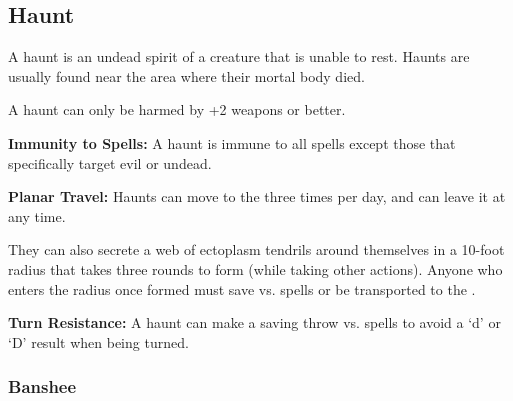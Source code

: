 \begin{multicols*}{2}
\subsection{Haunt}
A haunt is an undead spirit of a creature that is unable to rest. Haunts are usually found near the area where their mortal body died.

A haunt can only be harmed by +2 weapons or better.

\textbf{Immunity to Spells:} A haunt is immune to all spells except those that specifically target evil or undead.

\textbf{Planar Travel:} Haunts can move to the  three times per day, and can leave it at any time.

They can also secrete a web of ectoplasm tendrils around themselves in a 10-foot radius that takes three rounds to form (while taking other actions). Anyone who enters the radius once formed must save vs. spells or be transported to the .

\textbf{Turn Resistance:} A haunt can make a saving throw vs. spells to avoid a ‘d’ or ‘D’ result when being turned.

\subsubsection{Banshee}


\end{multicols*}
